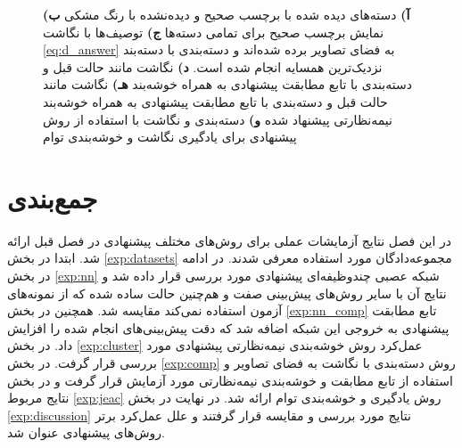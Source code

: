 \begin{figure}[t]
{  \textbf{آ)}
   دسته‌های دیده شده با برچسب صحیح و دیده‌نشده با رنگ مشکی
\textbf{ب)}
 نمایش برچسب صحیح برای تمامی دسته‌ها
  \textbf{ج)} توصیف‌ها با نگاشت \eqref{eq:d_answer}
  به فضای تصاویر برده شده‌اند و دسته‌بندی با دسته‌بند نزدیک‌ترین همسایه انجام شده است.
  \textbf{د)}
   نگاشت مانند حالت قبل و دسته‌بندی با تابع مطابقت پیشنهادی به همراه خوشه‌بند 
  \textbf{هـ)}
   نگاشت مانند حالت قبل و دسته‌بندی با تابع مطابقت پیشنهادی به همراه خوشه‌بند نیمه‌نظارتی پیشنهاد شده
  \textbf{و)}
  دسته‌بندی و نگاشت با استفاده از روش پیشنهادی برای یادگیری نگاشت و خوشه‌بندی توام
  }
\label{fig:discussion}
\end{figure}

\section{جمع‌بندی}
در این فصل نتایج آزمایشات عملی برای روش‌های مختلف پیشنهادی در فصل قبل ارائه شد. ابتدا در بخش \ref{exp:datasets} مجموعه‌دادگان مورد استفاده معرفی شدند. در ادامه
در بخش \ref{exp:nn} شبکه عصبی چندوظیفه‌ای پیشنهادی مورد بررسی قرار داده شد و نتایج آن با سایر روش‌های پیش‌بینی صفت و هم‌چنین حالت ساده شده که از نمونه‌های آزمون استفاده نمی‌کند مقایسه شد. همچنین در بخش \ref{exp:nn_comp} تابع مطابقت پیشنهادی به خروجی این شبکه اضافه شد که دقت پیش‌بینی‌های انجام شده را افزایش داد. در بخش \ref{exp:cluster} عمل‌کرد روش خوشه‌بندی نیمه‌نظارتی پیشنهادی مورد بررسی قرار گرفت. در بخش  \ref{exp:comp}  روش دسته‌بندی با نگاشت به فضای تصاویر و استفاده از تابع مطابقت و خوشه‌‌بندی نیمه‌نظارتی مورد آزمایش قرار گرفت و در بخش نتایج مربوط \ref{exp:jeac} روش یادگیری و خوشه‌بندی توام ارائه شد. در نهایت در بخش \ref{exp:discussion} نتایج مورد بررسی و مقایسه قرار گرفتند و علل عمل‌کرد برتر روش‌های پیشنهادی عنوان شد.
